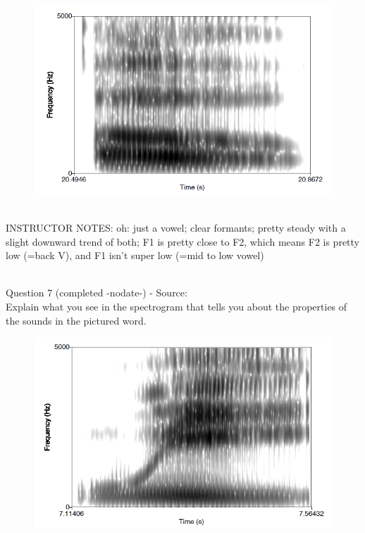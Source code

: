 \documentclass[12pt]{article}
\begin{document}
\begin{figure}[H]
\includegraphics{../images/spectrogram_oh.png}
\end{figure}

~\\
INSTRUCTOR NOTES: oh: just a vowel; clear formants; pretty steady with a slight downward trend of both; F1 is pretty close to F2, which means F2 is pretty low (=back V), and F1 isn't super low (=mid to low vowel)


~\\

{\large Question 7} (completed -nodate-) - Source: \\

Explain what you see in the spectrogram that tells you about the properties of the sounds in the pictured word.\\

\begin{figure}[H]
\includegraphics{../images/spectrogram_we.png}
\end{figure}
\end{document}
